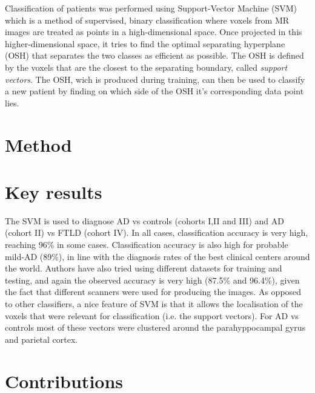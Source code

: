 \documentclass[11pt,a4paper,oneside]{report}
\begin{document}

Classification of patients was performed using Support-Vector Machine (SVM) which is a method of supervised, binary classification where voxels from MR images are treated as points in a high-dimensional space. Once projected in this higher-dimensional space, it tries to find the optimal separating hyperplane (OSH) that separates the two classes as efficient as possible. The OSH is defined by the voxels that are the closest to the separating boundary, called \emph{support vectors}. \cite{vapnik1998statistical,bishop2006pattern} The OSH, wich is produced during training, can then be used to classify a new patient by finding on which side of the OSH it's corresponding data point lies. 

\section*{Method}



\section*{Key results}

The SVM is used to diagnose AD vs controls (cohorts I,II and III) and AD (cohort II) vs FTLD (cohort IV). In all cases, classification accuracy is very high, reaching 96\% in some cases. Classification accuracy is also high for probable mild-AD (89\%), in line with the diagnosis rates of the best clinical centers around the world. Authors have also tried using different datasets for training and testing, and again the observed accuracy is very high (87.5\% and 96.4\%), given the fact that different scanners were used for producing the images. As opposed to other classifiers, a nice feature of SVM is that it allows the localisation of the voxels that were relevant for classification (i.e. the support vectors). For AD vs controls most of these vectors were clustered around the parahyppocampal gyrus and parietal cortex. 

\section*{Contributions}

\end{document}
